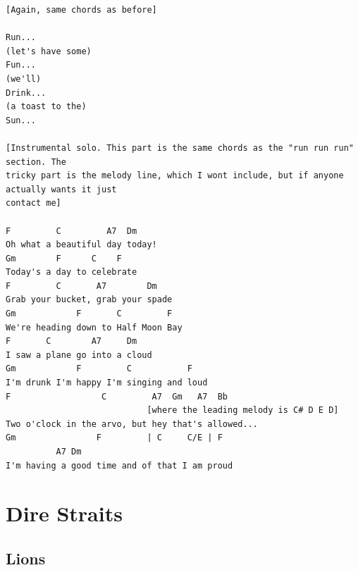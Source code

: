 \documentclass[a4paper]{article}
\begin{document}
\begin{Verbatim}[commandchars=\\\{\}]
[Again, same chords as before]

Run...
(let's have some)
Fun...
(we'll)
Drink...
(a toast to the)
Sun...

[Instrumental solo. This part is the same chords as the "run run run" section. The 
tricky part is the melody line, which I wont include, but if anyone actually wants it just 
contact me]

F         C         A7  Dm
Oh what a beautiful day today!
Gm        F      C    F
Today's a day to celebrate
F         C       A7        Dm
Grab your bucket, grab your spade
Gm            F       C         F
We're heading down to Half Moon Bay
F       C        A7     Dm
I saw a plane go into a cloud
Gm            F         C           F
I'm drunk I'm happy I'm singing and loud
F                  C         A7  Gm   A7  Bb
                            [where the leading melody is C# D E D]
Two o'clock in the arvo, but hey that's allowed...
Gm                F         | C     C/E | F 
          A7 Dm
I'm having a good time and of that I am proud
\end{Verbatim}
\newpage
\section{Dire Straits} %
\label{sec:Dire Straits}
\subsection{Lions} %
\label{sub:Lions}
    	  
\end{document}
